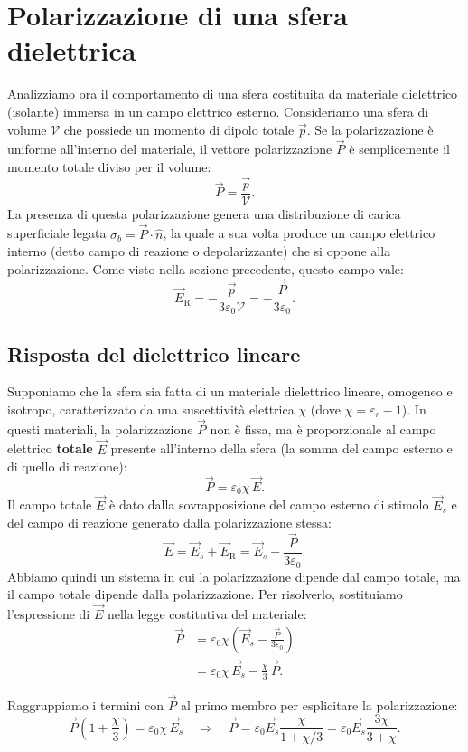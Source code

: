 \documentclass{book}
\begin{document}
\section{Polarizzazione di una sfera dielettrica}

Analizziamo ora il comportamento di una sfera costituita da materiale dielettrico (isolante) immersa in un campo elettrico esterno.
Consideriamo una sfera di volume $\mathcal{V}$ che possiede un momento di dipolo totale $\vec{p}$. Se la polarizzazione è uniforme all'interno del materiale, il vettore polarizzazione $\vec{P}$ è semplicemente il momento totale diviso per il volume:
$$
\vec{P} = \frac{\vec{p}}{\mathcal{V}}.
$$
La presenza di questa polarizzazione genera una distribuzione di carica superficiale legata $\sigma_b = \vec{P}\cdot\hat{n}$, la quale a sua volta produce un campo elettrico interno (detto campo di reazione o depolarizzante) che si oppone alla polarizzazione. Come visto nella sezione precedente, questo campo vale:
$$
\vec{E}_{\mathrm{R}} = -\frac{\vec{p}}{3\varepsilon_0\mathcal{V}} = -\frac{\vec{P}}{3\varepsilon_0}.
$$
\subsection*{Risposta del dielettrico lineare}
Supponiamo che la sfera sia fatta di un materiale dielettrico lineare, omogeneo e isotropo, caratterizzato da una suscettività elettrica $\chi$ (dove $\chi=\varepsilon_r-1$).
In questi materiali, la polarizzazione $\vec{P}$ non è fissa, ma è proporzionale al campo elettrico \textbf{totale} $\vec{E}$ presente all'interno della sfera (la somma del campo esterno e di quello di reazione):
$$
\vec{P} = \varepsilon_0\chi\,\vec{E}.
$$
Il campo totale $\vec{E}$ è dato dalla sovrapposizione del campo esterno di stimolo $\vec{E}_s$ e del campo di reazione generato dalla polarizzazione stessa:
$$
\vec{E} = \vec{E}_s + \vec{E}_{\mathrm{R}} = \vec{E}_s - \frac{\vec{P}}{3\varepsilon_0}.
$$
Abbiamo quindi un sistema in cui la polarizzazione dipende dal campo totale, ma il campo totale dipende dalla polarizzazione. Per risolverlo, sostituiamo l'espressione di $\vec{E}$ nella legge costitutiva del materiale:
\begin{align}
\vec{P} &= \varepsilon_0\chi\left(\vec{E}_s - \frac{\vec{P}}{3\varepsilon_0}\right) \nonumber \\
&= \varepsilon_0\chi\,\vec{E}_s - \frac{\chi}{3}\,\vec{P}. \nonumber
\end{align}

Raggruppiamo i termini con $\vec{P}$ al primo membro per esplicitare la polarizzazione:
$$
\vec{P}\left(1+\frac{\chi}{3}\right) = \varepsilon_0\chi\,\vec{E}_s
\quad\Rightarrow\quad
\vec{P} = \varepsilon_0\vec{E}_s\frac{\chi}{1+\chi/3} = \varepsilon_0\vec{E}_s\frac{3\chi}{3+\chi}.
$$
\end{document}
